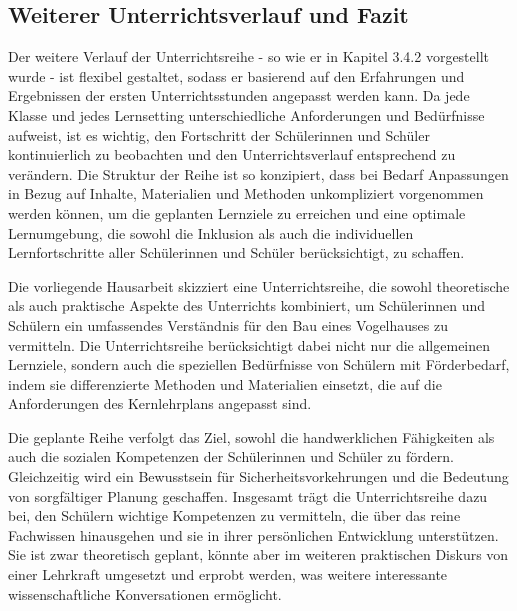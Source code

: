 \documentclass[12pt]{article}
\begin{document}
\subsection{Weiterer Unterrichtsverlauf und Fazit}

Der weitere Verlauf der Unterrichtsreihe - so wie er in Kapitel 3.4.2 vorgestellt wurde - ist flexibel gestaltet, sodass er basierend auf den Erfahrungen und Ergebnissen der ersten Unterrichtsstunden angepasst werden kann. Da jede Klasse und jedes Lernsetting unterschiedliche Anforderungen und Bedürfnisse aufweist, ist es wichtig, den Fortschritt der Schülerinnen und Schüler kontinuierlich zu beobachten und den Unterrichtsverlauf entsprechend zu verändern. Die Struktur der Reihe ist so konzipiert, dass bei Bedarf Anpassungen in Bezug auf Inhalte, Materialien und Methoden unkompliziert vorgenommen werden können, um die geplanten Lernziele zu erreichen und eine optimale Lernumgebung, die sowohl die Inklusion als auch die individuellen Lernfortschritte aller Schülerinnen und Schüler berücksichtigt, zu schaffen.

Die vorliegende Hausarbeit skizziert eine Unterrichtsreihe, die sowohl theoretische als auch praktische Aspekte des Unterrichts kombiniert, um Schülerinnen und Schülern ein umfassendes Verständnis für den Bau eines Vogelhauses zu vermitteln. Die Unterrichtsreihe berücksichtigt dabei nicht nur die allgemeinen Lernziele, sondern auch die speziellen Bedürfnisse von Schülern mit Förderbedarf, indem sie differenzierte Methoden und Materialien einsetzt, die auf die Anforderungen des Kernlehrplans angepasst sind.

Die geplante Reihe verfolgt das Ziel, sowohl die handwerklichen Fähigkeiten als auch die sozialen Kompetenzen der Schülerinnen und Schüler zu fördern. Gleichzeitig wird ein Bewusstsein für Sicherheitsvorkehrungen und die Bedeutung von sorgfältiger Planung geschaffen. Insgesamt trägt die Unterrichtsreihe dazu bei, den Schülern wichtige Kompetenzen zu vermitteln, die über das reine Fachwissen hinausgehen und sie in ihrer persönlichen Entwicklung unterstützen. Sie ist zwar theoretisch geplant, könnte aber im weiteren praktischen Diskurs von einer Lehrkraft umgesetzt und erprobt werden, was weitere interessante wissenschaftliche Konversationen ermöglicht.


\newpage
\printbibliography[heading=bibintoc]
\pagestyle{empty}
\end{document}
